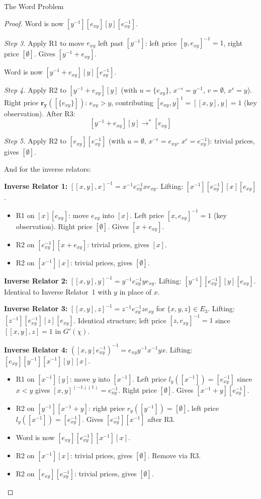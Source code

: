 \documentclass{article}
\theoremstyle{definition}
\theoremstyle{remark}
\theoremstyle{theorem}
\theoremstyle{definition}
\begin{document}
\begin{section}{The Word Problem}
\begin{proof}
Word is now $[y^{-1}][e_{xy}][y][e_{xy}^{-1}]$.

\textit{Step 3.} Apply R1 to move $e_{xy}$ left past $[y^{-1}]$: left price $[y,e_{xy}]^{-1}=1$, right price $[\emptyset]$. Gives $[y^{-1}+e_{xy}]$.

Word is now $[y^{-1}+e_{xy}][y][e_{xy}^{-1}]$.

\textit{Step 4.} Apply R2 to $[y^{-1}+e_{xy}][y]$ (with $u=\{e_{xy}\}$, $x^{-\epsilon}=y^{-1}$, $v=\emptyset$, $x^\epsilon=y$). Right price $\mathbf{r_y}([\{e_{xy}\}])$: $e_{xy}>y$, contributing $[e_{xy},y]^1=[[x,y],y]=1$ (key observation). After R3:
$$[y^{-1}+e_{xy}][y] \to^* [e_{xy}]$$

\textit{Step 5.} Apply R2 to $[e_{xy}][e_{xy}^{-1}]$ (with $u=\emptyset$, $x^{-\epsilon}=e_{xy}$, $x^\epsilon=e_{xy}^{-1}$): trivial prices, gives $[\emptyset]$.

And for the inverse relators:

\medskip
\noindent\textbf{Inverse Relator 1:}
$[[x,y],x]^{-1}=x^{-1}e_{xy}^{-1}xe_{xy}$.
Lifting: $[x^{-1}][e_{xy}^{-1}][x][e_{xy}]$.
\begin{itemize}
  \item R1 on $[x][e_{xy}]$: move $e_{xy}$ into $[x]$. Left price
    $[x,e_{xy}]^{-1}=1$ (key observation). Right price $[\emptyset]$.
    Gives $[x+e_{xy}]$.
  \item R2 on $[e_{xy}^{-1}][x+e_{xy}]$: trivial prices, gives $[x]$.
  \item R2 on $[x^{-1}][x]$: trivial prices, gives $[\emptyset]$.
\end{itemize}

\medskip
\noindent\textbf{Inverse Relator 2:}
$[[x,y],y]^{-1}=y^{-1}e_{xy}^{-1}ye_{xy}$.
Lifting: $[y^{-1}][e_{xy}^{-1}][y][e_{xy}]$.
Identical to Inverse Relator~1 with $y$ in place of $x$.

\medskip
\noindent\textbf{Inverse Relator 3:}
$[[x,y],z]^{-1}=z^{-1}e_{xy}^{-1}ze_{xy}$ for $\{x,y,z\}\in E_3$.
Lifting: $[z^{-1}][e_{xy}^{-1}][z][e_{xy}]$.
Identical structure; left price $[z,e_{xy}]^{-1}=1$ since
$[[x,y],z]=1$ in $G'(\chi)$.

\medskip
\noindent\textbf{Inverse Relator 4:}
$([x,y]e_{xy}^{-1})^{-1}=e_{xy}y^{-1}x^{-1}yx$.
Lifting: $[e_{xy}][y^{-1}][x^{-1}][y][x]$.
\begin{itemize}
  \item R1 on $[x^{-1}][y]$: move $y$ into $[x^{-1}]$. Left price
    $l_y([x^{-1}])=[e_{xy}^{-1}]$ since $x < y$ gives
    $[x,y]^{(-1)(1)}=e_{xy}^{-1}$. Right price $[\emptyset]$.
    Gives $[x^{-1}+y][e_{xy}^{-1}]$.
  \item R2 on $[y^{-1}][x^{-1}+y]$: right price $r_y([y^{-1}])=[\emptyset]$,
    left price $l_y([x^{-1}])=[e_{xy}^{-1}]$. Gives $[e_{xy}^{-1}][x^{-1}]$
    after R3.
  \item Word is now $[e_{xy}][e_{xy}^{-1}][x^{-1}][x]$.
  \item R2 on $[x^{-1}][x]$: trivial prices, gives $[\emptyset]$. Remove
    via R3.
  \item R2 on $[e_{xy}][e_{xy}^{-1}]$: trivial prices, gives
    $[\emptyset]$.
\end{itemize}
\end{proof}


\end{section}
\end{document}
